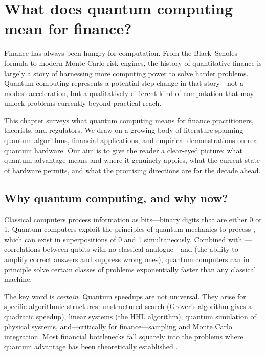 \chapter{What does quantum computing mean for finance?}


Finance has always been hungry for computation. From the Black--Scholes formula to modern Monte Carlo risk engines, the history of quantitative finance is largely a story of harnessing more computing power to solve harder problems. Quantum computing represents a potential step-change in that story---not a modest acceleration, but a qualitatively different kind of computation that may unlock problems currently beyond practical reach.

This chapter surveys what quantum computing means for finance practitioners, theorists, and regulators. We draw on a growing body of literature spanning quantum algorithms, financial applications, and empirical demonstrations on real quantum hardware. Our aim is to give the reader a clear-eyed picture: what quantum advantage means and where it genuinely applies, what the current state of hardware permits, and what the promising directions are for the decade ahead.

\section{Why quantum computing, and why now?}

Classical computers process information as bits---binary digits that are either 0 or 1. Quantum computers exploit the principles of quantum mechanics to process , which can exist in superpositions of 0 and 1 simultaneously. Combined with ---correlations between qubits with no classical analogue---and  (the ability to amplify correct answers and suppress wrong ones), quantum computers can in principle solve certain classes of problems exponentially faster than any classical machine.

The key word is \emph{certain}. Quantum speedups are not universal. They arise for specific algorithmic structures: unstructured search (Grover's algorithm gives a quadratic speedup), linear systems (the HHL algorithm), quantum simulation of physical systems, and---critically for finance---sampling and Monte Carlo integration. Most financial bottlenecks fall squarely into the problems where quantum advantage has been theoretically established \citep{egger_quantum_2020,herman_quantum_2023,orus_quantum_2019}.

